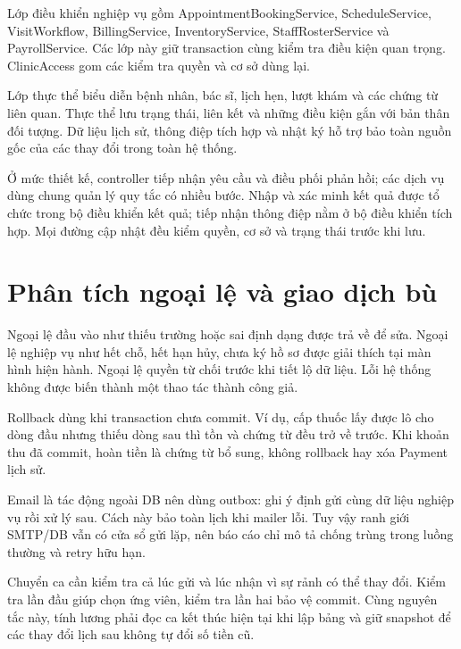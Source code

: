 Lớp điều khiển nghiệp vụ gồm Appointment\allowbreak{}Booking\allowbreak{}Service, Schedule\allowbreak{}Service, Visit\allowbreak{}Workflow, Billing\allowbreak{}Service, Inventory\allowbreak{}Service, Staff\allowbreak{}Roster\allowbreak{}Service và Payroll\allowbreak{}Service.\allowbreak{} Các lớp này giữ transaction cùng kiểm tra điều kiện quan trọng.\allowbreak{} Clinic\allowbreak{}Access gom các kiểm tra quyền và cơ sở dùng lại.\allowbreak{}

Lớp thực thể biểu diễn bệnh nhân, bác sĩ, lịch hẹn, lượt khám và các chứng từ liên quan.\allowbreak{} Thực thể lưu trạng thái, liên kết và những điều kiện gắn với bản thân đối tượng.\allowbreak{} Dữ liệu lịch sử, thông điệp tích hợp và nhật ký hỗ trợ bảo toàn nguồn gốc của các thay đổi trong toàn hệ thống.\allowbreak{}

Ở mức thiết kế, controller tiếp nhận yêu cầu và điều phối phản hồi; các dịch vụ dùng chung quản lý quy tắc có nhiều bước.\allowbreak{} Nhập và xác minh kết quả được tổ chức trong bộ điều khiển kết quả; tiếp nhận thông điệp nằm ở bộ điều khiển tích hợp.\allowbreak{} Mọi đường cập nhật đều kiểm quyền, cơ sở và trạng thái trước khi lưu.\allowbreak{}


\section{Phân tích ngoại lệ và giao dịch bù}
Ngoại lệ đầu vào như thiếu trường hoặc sai định dạng được trả về để sửa.\allowbreak{} Ngoại lệ nghiệp vụ như hết chỗ, hết hạn hủy, chưa ký hồ sơ được giải thích tại màn hình hiện hành.\allowbreak{} Ngoại lệ quyền từ chối trước khi tiết lộ dữ liệu.\allowbreak{} Lỗi hệ thống không được biến thành một thao tác thành công giả.\allowbreak{}

Rollback dùng khi transaction chưa commit.\allowbreak{} Ví dụ, cấp thuốc lấy được lô cho dòng đầu nhưng thiếu dòng sau thì tồn và chứng từ đều trở về trước.\allowbreak{} Khi khoản thu đã commit, hoàn tiền là chứng từ bổ sung, không rollback hay xóa Payment lịch sử.\allowbreak{}

Email là tác động ngoài DB nên dùng outbox:\allowbreak{} ghi ý định gửi cùng dữ liệu nghiệp vụ rồi xử lý sau.\allowbreak{} Cách này bảo toàn lịch khi mailer lỗi.\allowbreak{} Tuy vậy ranh giới SMTP/\allowbreak{}DB vẫn có cửa sổ gửi lặp, nên báo cáo chỉ mô tả chống trùng trong luồng thường và retry hữu hạn.\allowbreak{}

Chuyển ca cần kiểm tra cả lúc gửi và lúc nhận vì sự rảnh có thể thay đổi.\allowbreak{} Kiểm tra lần đầu giúp chọn ứng viên, kiểm tra lần hai bảo vệ commit.\allowbreak{} Cùng nguyên tắc này, tính lương phải đọc ca kết thúc hiện tại khi lập bảng và giữ snapshot để các thay đổi lịch sau không tự đổi số tiền cũ.\allowbreak{}


